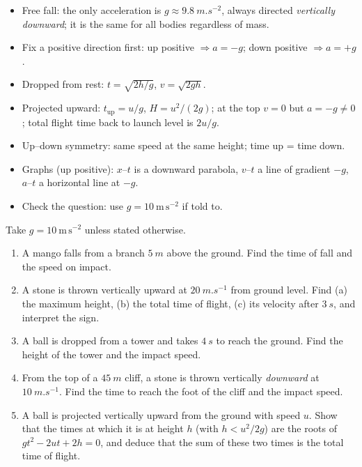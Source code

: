 \documentclass[11pt]{article}
\begin{document}
\begin{aretenir}
\begin{itemize}
\item Free fall: the only acceleration is $g \approx \SI{9.8}{m.s^{-2}}$, always directed \emph{vertically downward}; it is the same for all bodies regardless of mass.
\item Fix a positive direction first: up positive $\Rightarrow a = -g$; down positive $\Rightarrow a = +g$.
\item Dropped from rest: $t = \sqrt{2h/g}$, $v = \sqrt{2gh}$.
\item Projected upward: $t_{\text{up}} = u/g$, $H = u^2/(2g)$; at the top $v = 0$ but $a = -g \neq 0$; total flight time back to launch level is $2u/g$.
\item Up--down symmetry: same speed at the same height; time up = time down.
\item Graphs (up positive): $x$--$t$ is a downward parabola, $v$--$t$ a line of gradient $-g$, $a$--$t$ a horizontal line at $-g$.
\item Check the question: use $g = 10\ \mathrm{m\,s^{-2}}$ if told to.
\end{itemize}
\end{aretenir}

\begin{exercice}
Take $g = 10\ \mathrm{m\,s^{-2}}$ unless stated otherwise.
\begin{enumerate}
\item A mango falls from a branch $\SI{5}{m}$ above the ground. Find the time of fall and the speed on impact.
\item A stone is thrown vertically upward at $\SI{20}{m.s^{-1}}$ from ground level. Find (a) the maximum height, (b) the total time of flight, (c) its velocity after $\SI{3}{s}$, and interpret the sign.
\item A ball is dropped from a tower and takes $\SI{4}{s}$ to reach the ground. Find the height of the tower and the impact speed.
\item From the top of a $\SI{45}{m}$ cliff, a stone is thrown vertically \emph{downward} at $\SI{10}{m.s^{-1}}$. Find the time to reach the foot of the cliff and the impact speed.
\item A ball is projected vertically upward from the ground with speed $u$. Show that the times at which it is at height $h$ (with $h < u^2/2g$) are the roots of $gt^2 - 2ut + 2h = 0$, and deduce that the sum of these two times is the total time of flight.
\end{enumerate}
\end{exercice}
\end{document}
